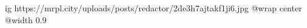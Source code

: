  
 
 
 
 

\ifcmt
  ig https://mrpl.city/uploads/posts/redactor/2de3h7ajtakf1ji6.jpg
  @wrap center
  @width 0.9
\fi
